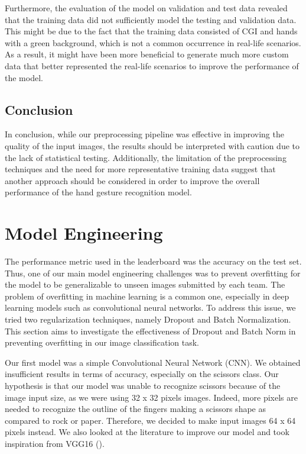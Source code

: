 \documentclass[a4paper]{article}
\begin{document}
Furthermore, the evaluation of the model on validation and test data revealed that the training data did not sufficiently model the testing and validation data. This might be due to the fact that the training data consisted of CGI and hands with a green background, which is not a common occurrence in real-life scenarios. As a result, it might have been more beneficial to generate much more custom data that better represented the real-life scenarios to improve the performance of the model.

\subsection{Conclusion}

In conclusion, while our preprocessing pipeline was effective in improving the quality of the input images, the results should be interpreted with caution due to the lack of statistical testing. Additionally, the limitation of the preprocessing techniques and the need for more representative training data suggest that another approach should be considered in order to improve the overall performance of the hand gesture recognition model.



\section{Model Engineering} \label{sec:ModelEng}


The performance metric used in the leaderboard was the accuracy on the test set. Thus, one of our main model engineering challenges was to prevent overfitting for the model to be generalizable to unseen images submitted by each team.
The problem of overfitting in machine learning is a common one, especially in deep learning models such as convolutional neural networks. To address this issue, we tried two regularization techniques, namely Dropout and Batch Normalization.
This section aims to investigate the effectiveness of Dropout and Batch Norm in preventing overfitting in our image classification task. 


Our first model was a simple Convolutional Neural Network (CNN). We obtained insufficient results in terms of accuracy, especially on the scissors class. Our hypothesis is that our model was unable to recognize scissors because of the image input size, as we were using 32 x 32 pixels images. Indeed, more pixels are needed to recognize the outline of the fingers making a scissors shape as compared to rock or paper. Therefore, we decided to make input images 64 x 64 pixels instead. We also looked at the literature to improve our model and took inspiration from VGG16 (\cite{VGG16}).
\end{document}
